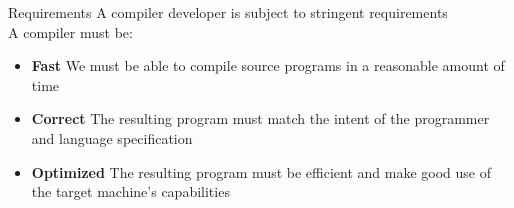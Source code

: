 \documentclass[../index.tex]{subfiles}
\begin{document}
\renewcommand{\currenttitle}{Requirements}
\begin{frame}[fragile]{\currenttitle}
  A compiler developer is subject to stringent requirements \\[2em]

  A compiler must be:
  \begin{itemize}
    \item \textbf{Fast} \textendash{} We must be able to compile source
      programs in a reasonable amount of time
    \item \textbf{Correct} \textendash{} The resulting program must match
      the intent of the programmer and language specification
    \item \textbf{Optimized} \textendash{} The resulting program must be
      efficient and make good use of the target machine's capabilities
  \end{itemize}
\end{frame}

\end{document}

